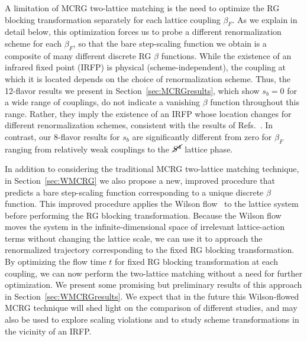 \documentclass{PoS}
\newcommand{\be}{\ensuremath{\beta} }
\newcommand{\Sb}{\ensuremath{\cancel{S^4}} }
\newcommand{\secref}[1]{Section~\ref{#1}}
\begin{document}
A limitation of MCRG two-lattice matching is the need to optimize the RG blocking transformation separately for each lattice coupling $\be_F$.
As we explain in detail below, this optimization forces us to probe a different renormalization scheme for each $\be_F$, so that the bare step-scaling function we obtain is a composite of many different discrete RG \be functions.
While the existence of an infrared fixed point (IRFP) is physical (scheme-independent), the coupling at which it is located depends on the choice of renormalization scheme.
Thus, the 12-flavor results we present in \secref{sec:MCRGresults}, which show $s_b = 0$ for a wide range of couplings, do not indicate a vanishing \be function throughout this range.
Rather, they imply the existence of an IRFP whose location changes for different renormalization schemes, consistent with the results of Refs.~\cite{Hasenfratz:2011xn, Hasenfratz:2011np}.
In contrast, our 8-flavor results for $s_b$ are significantly different from zero for $\be_F$ ranging from relatively weak couplings to the \Sb lattice phase.

In addition to considering the traditional MCRG two-lattice matching technique, in \secref{sec:WMCRG} we also propose a new, improved procedure that predicts a bare step-scaling function corresponding to a unique discrete \be function.
This improved procedure applies the Wilson flow~\cite{Narayanan:2006rf, Luscher:2010iy} to the lattice system before performing the RG blocking transformation.
Because the Wilson flow moves the system in the infinite-dimensional space of irrelevant lattice-action terms without changing the lattice scale, we can use it to approach the renormalized trajectory corresponding to the fixed RG blocking transformation. %
By optimizing the flow time $t$ for fixed RG blocking transformation at each coupling, we can now perform the two-lattice matching without a need for further optimization.
We present some promising but preliminary results of this approach in \secref{sec:WMCRGresults}.
We expect that in the future this Wilson-flowed MCRG technique will shed light on the comparison of different studies, and may also be used to explore scaling violations and to study scheme transformations in the vicinity of an IRFP.



\end{document}
